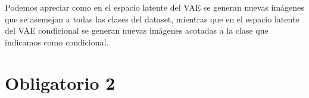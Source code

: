 \documentclass[11pt]{article}
\begin{document}
Podemos apreciar como en el espacio latente del VAE se generan nuevas imágenes que se asemejan a todas las clases del dataset, mientras que en el espacio latente del VAE condicional se generan nuevas imágenes acotadas a la clase que indicamos como condicional.
\newpage
\section{Obligatorio 2}

\newpage



\end{document}
